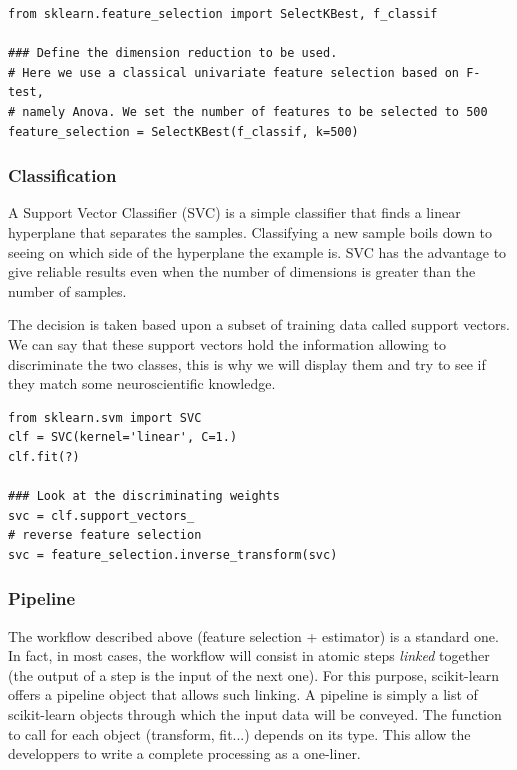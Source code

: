 \documentclass{frontiersSCNS} %
\begin{document}
\begin{lstlisting}
from sklearn.feature_selection import SelectKBest, f_classif

### Define the dimension reduction to be used.
# Here we use a classical univariate feature selection based on F-test,
# namely Anova. We set the number of features to be selected to 500
feature_selection = SelectKBest(f_classif, k=500)
\end{lstlisting}

\subsubsection{Classification}

A Support Vector Classifier (SVC) is a simple classifier that finds a linear
hyperplane that separates the samples. Classifying a new sample boils down to
seeing on which side of the hyperplane the example is. SVC has the advantage to
give reliable results even when the number of dimensions is greater than the
number of samples.

The decision is taken based upon a subset of training data called support
vectors. We can say that these support vectors hold the information allowing to
discriminate the two classes, this is why we will display them and try to see if
they match some neuroscientific knowledge.

\begin{lstlisting}
from sklearn.svm import SVC
clf = SVC(kernel='linear', C=1.)
clf.fit(?)

### Look at the discriminating weights
svc = clf.support_vectors_
# reverse feature selection
svc = feature_selection.inverse_transform(svc)
\end{lstlisting}

\subsubsection{Pipeline}

The workflow described above (feature selection + estimator) is a standard one.
In fact, in most cases, the workflow will consist in atomic steps
\textit{linked} together (the output of a step is the input of the next one).
For this purpose, scikit-learn offers a pipeline object that allows such
linking. A pipeline is simply a list of scikit-learn objects through which the
input data will be conveyed. The function to call for each object (transform,
fit...) depends on its type.
This allow the developpers to write a complete processing as a one-liner.
\end{document}
